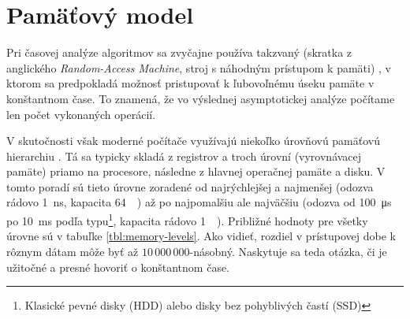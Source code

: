 \chapter{Pamäťový model}

Pri časovej analýze algoritmov sa zvyčajne používa takzvaný \RAM (skratka z anglického \emph{Random-Access Machine}, stroj s náhodným prístupom k pamäti) \citep{aho1974design}, v ktorom sa predpokladá možnosť pristupovať k ľubovoľnému úseku pamäte v konštantnom čase. To znamená, že vo výslednej asymptotickej analýze počítame len počet vykonaných operácií.

V skutočnosti však moderné počítače využívajú niekoľko úrovňovú pamäťovú hierarchiu \citep{drepper2007every}. Tá sa typicky skladá z registrov a troch úrovní \cache (vyrovnávacej pamäte) priamo na procesore, následne z hlavnej operačnej pamäte a disku. V tomto poradí sú tieto úrovne zoradené od najrýchlejšej a najmenšej (odozva rádovo \SI{1}{\nano\second}, kapacita \SI{64}{\kibi\byte}) až po najpomalšiu ale najväčšiu (odozva od \SI{100}{\micro\second} po \SI{10}{\milli\second} podľa typu\footnote{Klasické pevné disky (HDD) alebo disky bez pohyblivých častí (SSD)}, kapacita rádovo \SI{1}{\tebi\byte}). Približné hodnoty pre všetky úrovne sú v tabuľke \ref{tbl:memory-levels}. Ako vidieť, rozdiel v prístupovej dobe k rôznym dátam môže byť až $10\,000\,000$-násobný. Naskytuje sa teda otázka, či je užitočné a presné hovoriť o konštantnom čase.

